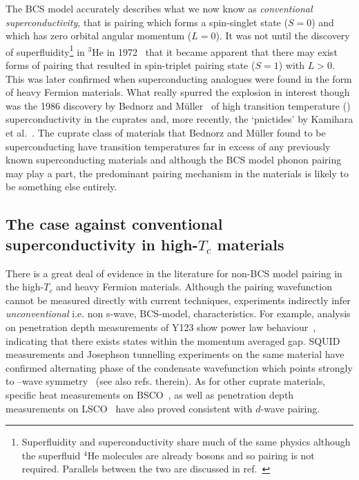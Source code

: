 The \ac{BCS} model accurately describes what we now know as \emph{conventional superconductivity}, that is pairing which forms a spin-singlet state ($S=0$) and which has zero orbital angular momentum ($L=0$). It was not until the discovery of superfluidity\footnote{Superfluidity and superconductivity share much of the same physics although the superfluid $^4$He molecules are already bosons and so pairing is not required. Parallels between the two are discussed in ref.~\cite{Annett2010}} in $^3$He in 1972~\cite{Osheroff1972} that it became apparent that there may exist forms of pairing that resulted in spin-triplet pairing state ($S=1$) with $L>0$. This was later confirmed when superconducting analogues were found in the form of heavy Fermion materials. What really spurred the explosion in interest though was the 1986 discovery by Bednorz and M\"uller~\cite{Bednorz} of high transition temperature (\Tc) superconductivity in the cuprates and, more recently, the `pnictides' by Kamihara et al.~\cite{Kamihara2008}. The cuprate class of materials that Bednorz and M\"uller found to be superconducting have transition temperatures far in excess of any previously known superconducting materials and although the \ac{BCS} model phonon pairing may play a part, the predominant pairing mechanism in the \highTc materials is likely to be something else entirely.

\subsection{The case against conventional superconductivity in high-$T_c$ materials}

There is a great deal of evidence in the literature for non-\ac{BCS} model pairing in the high-$T_c$ and heavy Fermion materials. Although the pairing wavefunction cannot be measured directly with current techniques, experiments indirectly infer \emph{unconventional} i.e. non s-wave, \ac{BCS}-model, characteristics. For example, analysis on penetration depth measurements of \ac{Y123} show power law behaviour~\cite{Annett1991}, indicating that there exists states within the momentum averaged gap. SQUID measurements and Josephson tunnelling experiments on the same material have confirmed alternating phase of the condensate wavefunction which points strongly to \DxTwoyTwo--wave symmetry~\cite{VanHarlingen1994} (see also refs. therein). As for other cuprate materials, specific heat measurements on \ac{BSCO}~\cite{Wang2011}, as well as penetration depth measurements on LSCO~\cite{Froehlich1996} have also proved consistent with $d$-wave pairing. 

